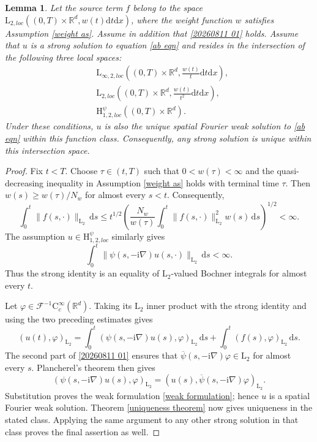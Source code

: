 \documentclass[11pt,reqno]{amsart}
\newtheorem{lem}[thm]{Lemma}
\theoremstyle{definition}
\theoremstyle{remark}
\newcommand\bR{\mathbb{R}}
\newcommand\cF{\mathcal{F}}
\numberwithin{equation}{section}
\begin{document}
\begin{lem}
										\label{strong unique lem}
Let the source term $f$ belong to the space $\mathrm{L}_{2,loc}\left( (0,T) \times \bR^d, w(t)\mathrm{d}t\mathrm{d}x \right)$, where the weight function $w$ satisfies Assumption \ref{weight as}. 
Assume in addition that \eqref{20260811 01} holds.
Assume that $u$ is a strong solution to equation \eqref{ab eqn} and resides in the intersection of the following three local spaces:
$$
\begin{aligned}
&\mathrm{L}_{\infty,2, loc}\left( (0,T) \times \bR^d ,\frac{w(t)}{t}\mathrm{d}t \mathrm{d}x\right),\\
&\mathrm{L}_{2, loc}\left( (0,T) \times \bR^d,\frac{w(t)}{t^2}\mathrm{d}t\mathrm{d}x \right),\\
&\mathrm{H}_{1,2,loc}^{\psi}\left( (0,T) \times \bR^d\right).
\end{aligned}
$$
Under these conditions, $u$ is also the unique spatial Fourier weak solution to \eqref{ab eqn} within this function class. 
Consequently, any strong solution is unique within this intersection space.
\end{lem}
\begin{proof}
Fix $t<T$.  Choose $\tau\in(t,T)$ such that $0<w(\tau)<\infty$ and the
quasi-decreasing inequality in Assumption \ref{weight as} holds with terminal
time $\tau$.  Then $w(s)\geq w(\tau)/N_w$ for almost every $s<t$.
Consequently,
\[
\int_0^t\|f(s,\cdot)\|_{\mathrm L_2}\,\mathrm{d}s
\leq t^{1/2}\left(\frac{N_w}{w(\tau)}
\int_0^t\|f(s,\cdot)\|_{\mathrm L_2}^2w(s)\,\mathrm{d}s\right)^{1/2}<\infty.
\]
The assumption $u\in\mathrm H_{1,2,loc}^{\psi}$ similarly gives
\[
\int_0^t\|\psi(s,-\mathrm i\nabla)u(s,\cdot)\|_{\mathrm L_2}
\,\mathrm{d}s<\infty.
\]
Thus the strong identity is an equality of $\mathrm L_2$-valued Bochner
integrals for almost every $t$.

Let $\varphi\in\cF^{-1}\mathrm C_c^\infty(\bR^d)$.  Taking its
$\mathrm L_2$ inner product with the strong identity and using the two
preceding estimates gives
\[
(u(t),\varphi)_{\mathrm L_2}
=\int_0^t(\psi(s,-\mathrm i\nabla)u(s),\varphi)_{\mathrm L_2}\,\mathrm{d}s
+\int_0^t(f(s),\varphi)_{\mathrm L_2}\,\mathrm{d}s.
\]
The second part of \eqref{20260811 01} ensures that
$\overline\psi(s,-\mathrm i\nabla)\varphi\in\mathrm L_2$ for almost every
$s$.  Plancherel's theorem then gives
\[
(\psi(s,-\mathrm i\nabla)u(s),\varphi)_{\mathrm L_2}
=(u(s),\overline\psi(s,-\mathrm i\nabla)\varphi)_{\mathrm L_2}.
\]
Substitution proves the weak formulation \eqref{weak formulation}; hence
$u$ is a spatial Fourier weak solution.  Theorem \ref{uniqueness theorem}
now gives uniqueness in the stated class.  Applying the same argument to any
other strong solution in that class proves the final assertion as well.

\end{proof}
\end{document}
